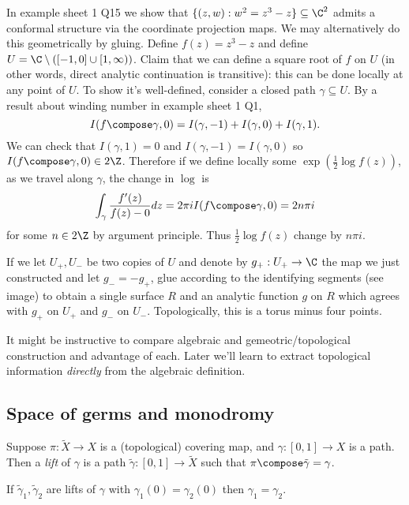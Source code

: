 \documentclass[a4paper]{article}
\begin{document}
\begin{eg}
  In example sheet 1 Q15 we show that \(\{(z, w): w^2 = z^3 - z\} \subseteq \C^2\) admits a conformal structure via the coordinate projection maps. We may alternatively do this geometrically by gluing. Define \(f(z) = z^3 - z\) and define \(U = \C \setminus ([-1, 0] \cup [1, \infty))\). Claim that we can define a square root of \(f\) on \(U\) (in other words, direct analytic continuation is transitive): this can be done locally at any point of \(U\). To show it's well-defined, consider a closed path \(\gamma \subseteq U\). By a result about winding number in example sheet 1 Q1,
  \[
    I(f \compose \gamma, 0) = I(\gamma, -1) + I(\gamma, 0) + I(\gamma, 1).
  \]
  We can check that \(I(\gamma, 1) = 0\) and \(I(\gamma, -1) = I(\gamma, 0)\) so \(I(f \compose \gamma, 0) \in 2 \Z\). Therefore if we define locally some \(\exp(\frac{1}{2} \log f(z))\), as we travel along \(\gamma\), the change in \(\log\) is
  \[
    \int_\gamma \frac{f'(z)}{f(z) - 0} dz = 2\pi i I(f \compose \gamma, 0) = 2n\pi i
  \]
  for some \(n \in 2\Z\) by argument principle. Thus \(\frac{1}{2} \log f(z)\) change by \(n\pi i\).

  If we let \(U_+, U_-\) be two copies of \(U\) and denote by \(g_+: U_+ \to \C\) the map we just constructed and let \(g_- = -g_+\), glue according to the identifying segments (see image) to obtain a single surface \(R\) and an analytic function \(g\) on \(R\) which agrees with \(g_+\) on \(U_+\) and \(g_-\) on \(U_-\). Topologically, this is a torus minus four points.

  It might be instructive to compare algebraic and gemeotric/topological construction and advantage of each. Later we'll learn to extract topological information \emph{directly} from the algebraic definition.
\end{eg}

\subsection{Space of germs and monodromy}

\begin{definition}[lift]
  Suppose \(\pi: \tilde X \to X\) is a (topological) covering map, and \(\gamma: [0, 1] \to X\) is a path. Then a \emph{lift} of \(\gamma\) is a path \(\tilde \gamma: [0, 1] \to \tilde X\) such that \(\pi \compose \tilde \gamma = \gamma\).
\end{definition}

\begin{proposition}
  If \(\tilde \gamma_1, \tilde \gamma_2\) are lifts of \(\gamma\) with \(\gamma_1(0) = \gamma_2(0)\) then \(\gamma_1 = \gamma_2\).
\end{proposition}
\end{document}
